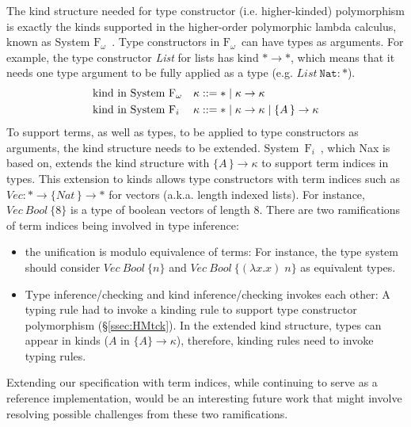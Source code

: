 \documentclass[runningheads,a4paper]{llncs}
\newcommand{\Fw}{\ensuremath{\mathrm{F}_\omega}}
\newcommand{\Fi}{\ensuremath{\mathrm{F}_i}}
\begin{document}
The kind structure needed for type constructor (i.e. higher-kinded) polymorphism is exactly
the kinds supported in the higher-order polymorphic lambda calculus,
known as System \Fw\ \cite{girard72thesis}. Type constructors in \Fw\ can have
types as arguments. For example, the type constructor \textit{List}
for lists has kind $* \to *$, which means that it needs one type argument
to be fully applied as a type (e.g. $\textit{List}~\texttt{Nat} : *$).
\begin{align*}
  &\text{kind in System \Fw}  &&\kappa ::= * \mid \kappa \to \kappa \\
  &\text{kind in System \Fi}  &&\kappa ::= * \mid \kappa \to \kappa
                                             \mid \{A\,\}\to \kappa
\end{align*}
To support terms, as well as types, to be applied to type constructors
as arguments, the kind structure needs to be extended.
System~\Fi\ \cite{AhnSheFioPit13}, which Nax is based on, extends
the kind structure
with $\{A\,\}\to \kappa$ to support term indices in types.
This extension to kinds allows type constructors with term indices
such as $\textit{Vec} : * \to \{\textit{Nat}\,\} \to *$ for vectors
(a.k.a. length indexed lists). For instance,
$\textit{Vec}~\textit{Bool}~\{8\}$ is a type of boolean vectors of length 8.
There are two ramifications of term indices being involved in type inference:
\begin{itemize}\vspace*{-.75ex}
\item the unification is modulo equivalence of terms: For instance,
  the type system should consider $\textit{Vec}~\textit{Bool}~\{n\}$ and
  $\textit{Vec}~\textit{Bool}~\{(\lambda x.x)\;n\}$ as equivalent types.
  \vspace*{.5ex}
\item Type inference/checking and kind inference/checking invokes each other:
  A typing rule had to invoke a kinding rule to support
  type constructor polymorphism  (\S\ref{ssec:HMtck}).
  In the extended kind structure, types can appear in kinds
  ($A$ in $\{\!A\}\to\kappa$), therefore, kinding rules
  need to invoke typing rules.
\end{itemize}
Extending our specification with term indices, while continuing to serve
as a reference implementation, would be an interesting future work that
might involve resolving possible challenges from these two ramifications.


\end{document}
